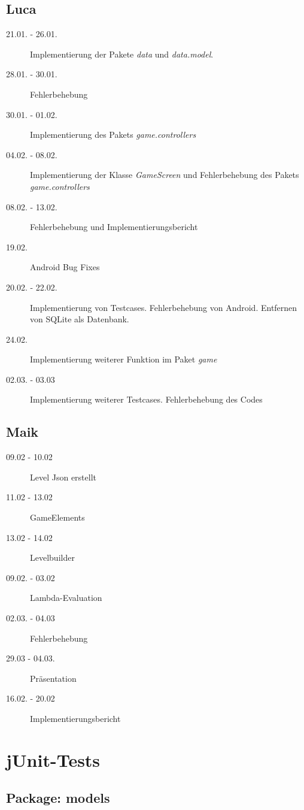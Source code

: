 \documentclass[parskip=full]{scrreprt}
\begin{document}
\section{Luca}

\begin{description}
\item[21.01. - 26.01.]
Implementierung der Pakete \emph{data} und \emph{data.model}.
\item[28.01. - 30.01.]
Fehlerbehebung
\item[30.01. - 01.02.]
Implementierung des Pakets \emph{game.controllers}
\item[04.02. - 08.02.]
Implementierung der Klasse \emph{GameScreen} und Fehlerbehebung des Pakets \emph{game.controllers}
\item[08.02. - 13.02.]
Fehlerbehebung und Implementierungsbericht
\item[19.02.]
Android Bug Fixes
\item[20.02. - 22.02.]
Implementierung von Testcases. Fehlerbehebung von Android. Entfernen von SQLite als Datenbank.
\item[24.02.]
Implementierung weiterer Funktion im Paket \emph{game}
\item[02.03. - 03.03]
Implementierung weiterer Testcases. Fehlerbehebung des Codes
\end{description}

\section{Maik}
\begin{description}
\item[09.02 - 10.02] Level Json erstellt
\item[11.02 - 13.02] GameElements
\item[13.02 - 14.02] Levelbuilder
\item[09.02. - 03.02] Lambda-Evaluation
\item[02.03. - 04.03] Fehlerbehebung 
\item[29.03 - 04.03.] Präsentation
\item[16.02. - 20.02] Implementierungsbericht
\end{description}

\chapter{jUnit-Tests}

\section{Package: models}
\end{document}

